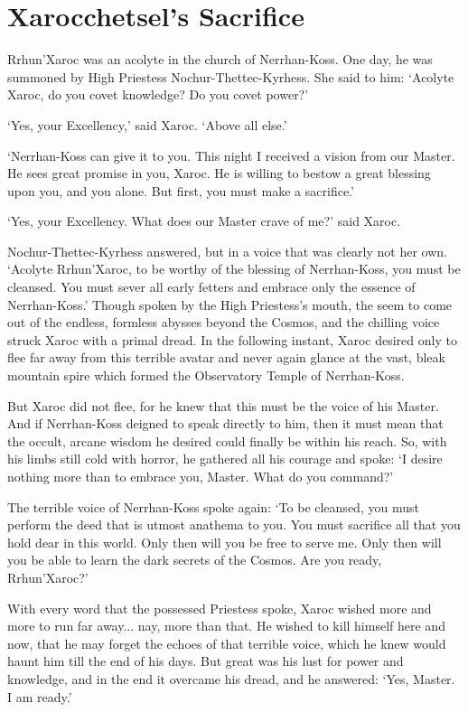 \section{Xarocchetsel's Sacrifice}
Rrhun'Xaroc was an acolyte in the church of Nerrhan-Koss. One day, he was summoned by High Priestess Nochur-Thettec-Kyrhess. She said to him: `Acolyte Xaroc, do you covet knowledge? Do you covet power?'

`Yes, your Excellency,' said Xaroc. `Above all else.' 

`Nerrhan-Koss can give it to you. This night I received a vision from our Master. He sees great promise in you, Xaroc. He is willing to bestow a great blessing upon you, and you alone. But first, you must make a sacrifice.' 

`Yes, your Excellency. What does our Master crave of me?' said Xaroc. 

Nochur-Thettec-Kyrhess answered, but in a voice that was clearly not her own. `Acolyte Rrhun'Xaroc, to be worthy of the blessing of Nerrhan-Koss, you must be cleansed. You must sever all early fetters and embrace only the essence of Nerrhan-Koss.' Though spoken by the High Priestess's mouth, the seem to come out of the endless, formless abysses beyond the Cosmos, and the chilling voice struck Xaroc with a primal dread. In the following instant, Xaroc desired only to flee far away from this terrible avatar and never again glance at the vast, bleak mountain spire which formed the Observatory Temple of Nerrhan-Koss. 

But Xaroc did not flee, for he knew that this must be the voice of his Master. And if Nerrhan-Koss deigned to speak directly to him, then it must mean that the occult, arcane wisdom he desired could finally be within his reach. So, with his limbs still cold with horror, he gathered all his courage and spoke: `I desire nothing more than to embrace you, Master. What do you command?' 

The terrible voice of Nerrhan-Koss spoke again: `To be cleansed, you must perform the deed that is utmost anathema to you. You must sacrifice all that you hold dear in this world. Only then will you be free to serve me. Only then will you be able to learn the dark secrets of the Cosmos. Are you ready, Rrhun'Xaroc?' 

With every word that the possessed Priestess spoke, Xaroc wished more and more to run far away... nay, more than that. He wished to kill himself here and now, that he may forget the echoes of that terrible voice, which he knew would haunt him till the end of his days. But great was his lust for power and knowledge, and in the end it overcame his dread, and he answered: `Yes, Master. I am ready.' 

